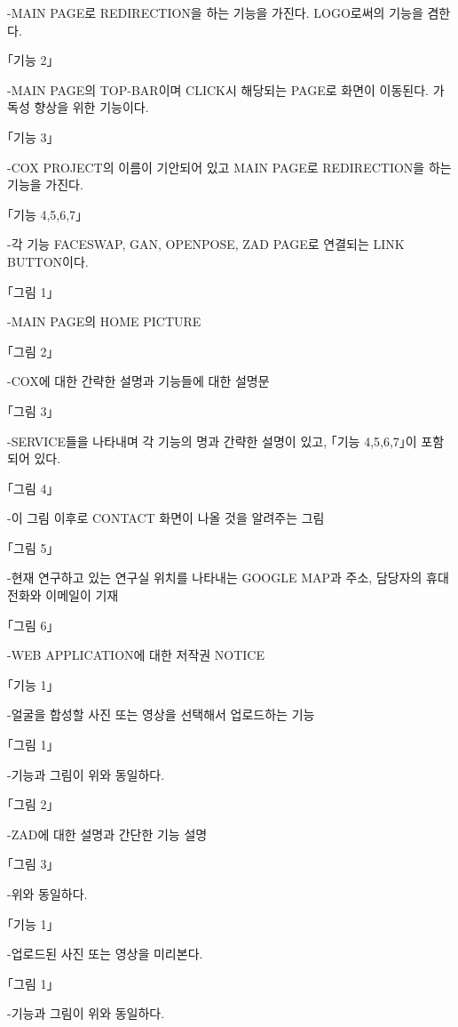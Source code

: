 \documentclass{oblivoir}
\begin{document}
-MAIN PAGE로 REDIRECTION을 하는 기능을 가진다. LOGO로써의 기능을 겸한다.

｢기능 2｣

-MAIN PAGE의 TOP-BAR이며 CLICK시 해당되는 PAGE로 화면이 이동된다. 가독성 향상을 위한 기능이다.

｢기능 3｣

-COX PROJECT의 이름이 기안되어 있고 MAIN PAGE로 REDIRECTION을 하는 기능을 가진다.

｢기능 4,5,6,7｣

-각 기능 FACESWAP, GAN, OPENPOSE, ZAD PAGE로 연결되는 LINK BUTTON이다.

｢그림 1｣

-MAIN PAGE의 HOME PICTURE

｢그림 2｣

-COX에 대한 간략한 설명과 기능들에 대한 설명문

｢그림 3｣

-SERVICE들을 나타내며 각 기능의 명과 간략한 설명이 있고, ｢기능 4,5,6,7｣이 포함되어 있다.

｢그림 4｣

-이 그림 이후로 CONTACT 화면이 나올 것을 알려주는 그림

｢그림 5｣

-현재 연구하고 있는 연구실 위치를 나타내는 GOOGLE MAP과 주소, 담당자의 휴대전화와 이메일이 기재

｢그림 6｣

-WEB APPLICATION에 대한 저작권 NOTICE

\begin{figure}[h!]
\centering
\end{figure}
｢기능 1｣

-얼굴을 합성할 사진 또는 영상을 선택해서 업로드하는 기능

｢그림 1｣

-기능과 그림이 위와 동일하다.

｢그림 2｣

-ZAD에 대한 설명과 간단한 기능 설명

｢그림 3｣

-위와 동일하다.

\begin{figure}[h!]
\centering
\end{figure}

｢기능 1｣

-업로드된 사진 또는 영상을 미리본다.

｢그림 1｣

-기능과 그림이 위와 동일하다.
\end{document}
